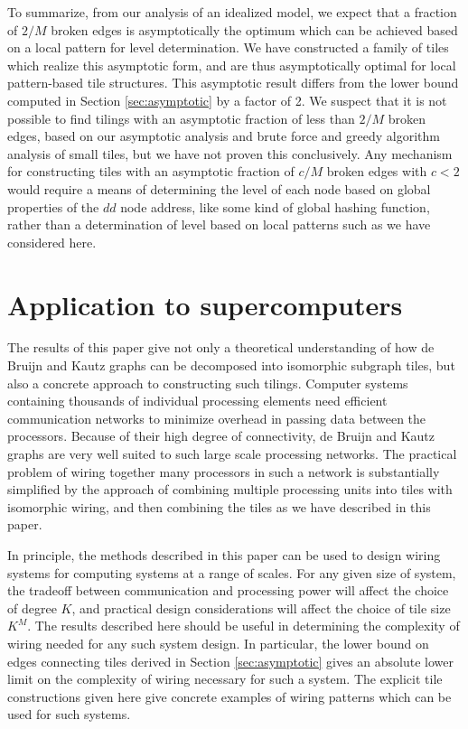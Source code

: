 \documentclass[12pt]{article}
\begin{document}
To summarize, from our analysis of an idealized model, we expect that
a fraction of $2/M$ broken edges is asymptotically the optimum which
can be achieved based on a local pattern for level determination.  We
have constructed a family of tiles which realize this asymptotic form,
and are thus asymptotically optimal for local pattern-based tile
structures.  This asymptotic result differs from the lower bound
computed in Section
\ref{sec:asymptotic} by a factor of 2.  We suspect that it is not possible to
find tilings with an asymptotic fraction of less than $2/M$ broken
edges, based on our asymptotic analysis and brute force and greedy
algorithm analysis of small tiles, but we have not proven this
conclusively.  Any mechanism for constructing tiles with an asymptotic
fraction of $c/M$ broken edges with $c < 2$ would require a means of
determining the level of each node based on global properties of the
$dd$ node address, like some kind of global hashing function, rather
than a determination of level based on local patterns such as we have
considered here.

\section{Application to supercomputers}

The results of this paper give not only a theoretical understanding of
how de Bruijn and Kautz graphs can be decomposed into isomorphic
subgraph tiles, but also a concrete approach to constructing such
tilings.  Computer systems containing thousands of individual
processing elements need efficient communication networks to minimize
overhead in passing data between the processors.  Because of their
high degree of connectivity, de Bruijn and Kautz graphs are very well
suited to such large scale processing networks.  The practical problem
of wiring together many processors in such a network is substantially
simplified by the approach of combining multiple processing units into
tiles with isomorphic wiring, and then combining the tiles as we have
described in this paper.

In principle, the methods described in this paper can be used to
design wiring systems for computing systems at a range of scales.  For
any given size of system, the tradeoff between communication and
processing power will affect the choice of degree $K$, and practical
design considerations will affect the choice of tile size $K^M$.  The
results described here should be useful in determining the complexity
of wiring needed for any such system design.  In particular, the lower
bound on edges connecting tiles derived in Section
\ref{sec:asymptotic} gives an absolute lower limit on the complexity
of wiring necessary for such a system.  The explicit tile
constructions given here give concrete examples of wiring patterns
which can be used for such systems.
\end{document}
